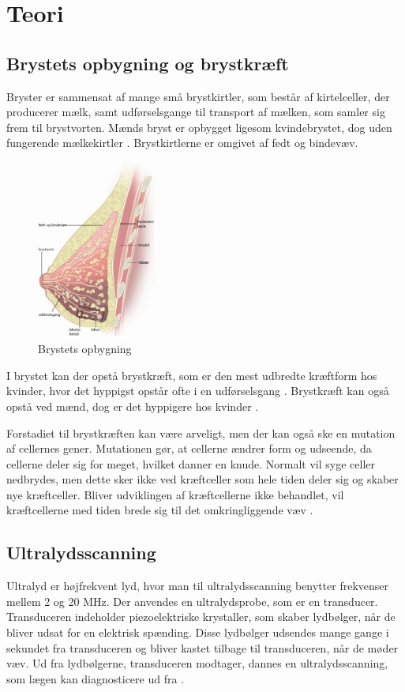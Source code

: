 \chapter{Teori}\label{Teori}

\section{Brystets opbygning og brystkræft}
Bryster er sammensat af mange små brystkirtler, som består af kirtelceller, der producerer mælk, samt udførselsgange til transport af mælken, som samler sig frem til brystvorten. Mænds bryst er opbygget ligesom kvindebrystet, dog uden fungerende mælkekirtler \cite{Mand}. Brystkirtlerne er omgivet af fedt og bindevæv. \citep{Bryst} 

\begin{figure}[H]
    \centering
    \includegraphics[width=0.35\textwidth]{figurer/r/bryst}
    \caption{Brystets opbygning \citep{Bryst}}
    \label{Brystet}
\end{figure}

I brystet kan der opstå brystkræft, som er den mest udbredte kræftform hos kvinder, hvor det hyppigst opstår ofte i en udførselsgang \citep{Bryst}. Brystkræft kan også opstå ved mænd, dog er det hyppigere hos kvinder \cite{Mand}.

Forstadiet til brystkræften kan være arveligt, men der kan også ske en mutation af cellernes gener. Mutationen gør, at cellerne ændrer form og udseende, da cellerne deler sig for meget, hvilket danner en knude. Normalt vil syge celler nedbrydes, men dette sker ikke ved kræftceller som hele tiden deler sig og skaber nye kræftceller. Bliver udviklingen af kræftcellerne ikke behandlet, vil kræftcellerne med tiden brede sig til det omkringliggende væv \cite{Udvikling}.

\section{Ultralydsscanning}
Ultralyd er højfrekvent lyd, hvor man til ultralydsscanning benytter frekvenser mellem 2 og 20 MHz. Der anvendes en ultralydsprobe, som er en transducer. Transduceren indeholder piezoelektriske krystaller, som skaber lydbølger, når de bliver udsat for en elektrisk spænding. Disse lydbølger udsendes mange gange i sekundet fra transduceren og bliver kastet tilbage til transduceren, når de møder væv. Ud fra lydbølgerne, transduceren modtager, dannes en ultralydsscanning, som lægen kan diagnosticere ud fra \cite{Ultralydsscanning}.

